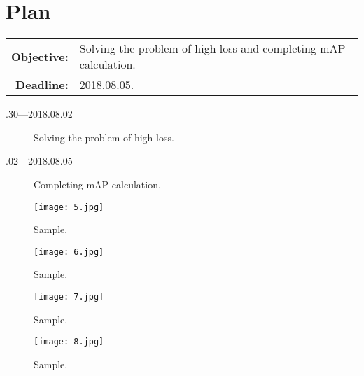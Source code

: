\documentclass[a4paper]{article}
\begin{document}
\section{Plan}
\begin{tabular}{rl}
	\textbf{Objective:} & Solving the problem of high loss and completing mAP calculation. \\
	\textbf{Deadline:} & 2018.08.05.
\end{tabular}
\begin{description}
	\item[.30---2018.08.02] Solving the problem of high loss.
	\item[.02---2018.08.05] Completing mAP calculation. 
\end{description}
{\small
	
	
}
\begin{figure}
	\begin{center}
		\texttt{[image: 5.jpg]}\\
		\caption{Sample.}\label{5}
	\end{center}
\end{figure}
\begin{figure}
	\begin{center}
		\texttt{[image: 6.jpg]}\\
		\caption{Sample.}\label{6}
	\end{center}
\end{figure}
\begin{figure}
	\begin{center}
		\texttt{[image: 7.jpg]}\\
		\caption{Sample.}\label{7}
	\end{center}
\end{figure}
\begin{figure}
	\begin{center}
		\texttt{[image: 8.jpg]}\\
		\caption{Sample.}\label{8}
	\end{center}
\end{figure}
\end{document}
